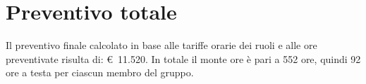 \section{Preventivo totale}

Il preventivo finale calcolato in base alle tariffe orarie dei ruoli e alle ore preventivate risulta di: \euro~11.520.
In totale il monte ore è pari a 552 ore, quindi 92 ore a testa per ciascun membro del gruppo.
